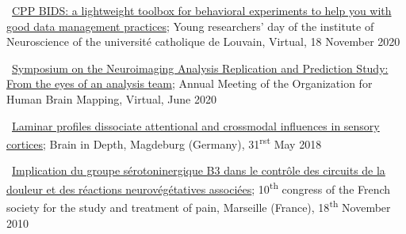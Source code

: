 \textbullet~\href{https://osf.io/y7cjn/}{CPP BIDS: a lightweight toolbox for behavioral experiments to help you with good data management practices}; 
Young researchers' day of the institute of Neuroscience of the université catholique de Louvain, 
Virtual,  
18 November 2020

\textbullet~\href{https://osf.io/b8p9e/}{Symposium on the Neuroimaging Analysis
Replication and Prediction Study: From the eyes of an analysis team}; 
Annual Meeting of the Organization for Human Brain Mapping, 
Virtual,  
June 2020


\textbullet~\href{https://osf.io/b8p9e/}{Laminar profiles dissociate attentional and crossmodal influences in sensory cortices}; 
Brain in Depth, 
Magdeburg (Germany), 
31\textsuperscript{rst} May 2018

\textbullet~\href{https://osf.io/r7gfm/}{Implication du groupe sérotoninergique B3 dans le contrôle des circuits de la douleur et des réactions neurovégétatives associées}; 
10\textsuperscript{th} congress of the French society for the study and treatment of pain, 
Marseille (France), 
18\textsuperscript{th} November 2010
